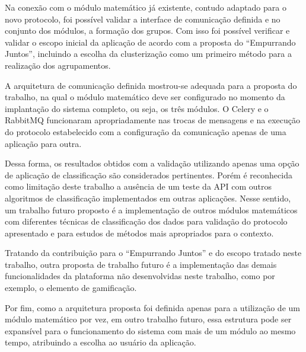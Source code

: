   Na conexão com o módulo matemático já existente, contudo adaptado para o novo protocolo, foi possível validar a interface de 
  comunicação definida e no conjunto dos módulos, a formação dos grupos. Com isso foi possível verificar e validar o escopo 
  inicial da aplicação de acordo com a proposta do ``Empurrando Juntos'', incluindo a escolha da clusterização 
  como um primeiro método para a realização dos agrupamentos. 
  
  A arquitetura de comunicação definida mostrou-se adequada para a proposta do trabalho, na qual o módulo matemático 
  deve ser configurado no momento da implantação do sistema completo, ou seja, os três módulos. O Celery e o RabbitMQ funcionaram 
  apropriadamente nas trocas de mensagens e na execução do protocolo estabelecido com a configuração
  da comunicação apenas de uma aplicação para outra. 
  
  Dessa forma, os resultados obtidos com a validação utilizando apenas uma opção de aplicação de classificação são considerados pertinentes.
  Porém é reconhecida como limitação deste trabalho a ausência de um teste da API com outros algoritmos de classificação implementados em outras aplicações.
  Nesse sentido, um trabalho futuro proposto é a implementação de outros módulos matemáticos com diferentes técnicas
  de classificação dos dados para validação do protocolo apresentado e para estudos de métodos mais apropriados para o contexto.
  
  Tratando da contribuição para o ``Empurrando Juntos'' e do escopo tratado neste trabalho, outra proposta de trabalho futuro é a 
  implementação das demais funcionalidades da plataforma não desenvolvidas neste trabalho,
  como por exemplo, o elemento de gamificação.
  
  Por fim, como a arquitetura proposta foi definida apenas para a utilização de um módulo matemático por vez, em outro trabalho futuro, 
  essa estrutura pode ser expansível para o funcionamento do sistema com mais de um módulo ao mesmo tempo, atribuindo a escolha ao usuário da aplicação.
  